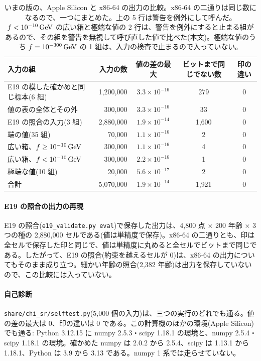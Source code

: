 \begin{table}[H]
\centering\small
\begin{tabular}{lrccc}
\toprule
入力の組 & 入力の数 & 値の差の最大 & ビットまで同じでない数 & 印の違い\\
\midrule
E19 の模した確かめと同じ標本(6 組) & 1{,}200{,}000 & $3.3\times10^{-16}$ & 279 & 0\\
値の表の全体とその外 & 300{,}000 & $3.3\times10^{-16}$ & 33 & 0\\
E19 の照合の入力(3 組) & 2{,}880{,}000 & $1.9\times10^{-14}$ & 1{,}600 & 0\\
端の値(35 組) & 70{,}000 & $1.1\times10^{-16}$ & 2 & 0\\
広い箱、$f\ge10^{-10}\,\mathrm{GeV}$ & 300{,}000 & $1.1\times10^{-16}$ & 4 & 0\\
\midrule
広い箱、$f<10^{-10}\,\mathrm{GeV}$ & 300{,}000 & $2.2\times10^{-16}$ & 1 & 0\\
極端な値(10 組) & 20{,}000 & $5.6\times10^{-17}$ & 2 & 0\\
\midrule
合計 & 5{,}070{,}000 & $1.9\times10^{-14}$ & 1{,}921 & 0\\
\bottomrule
\end{tabular}
\caption{いまの版の、Apple Silicon と x86-64 の出力の比較。x86-64 の二通りは同じ数になるので、一つにまとめた。上の 5 行は警告を例外にして呼んだ。$f<10^{-10}\,\mathrm{GeV}$ の広い箱と極端な値の 2 行は、警告を例外にすると止まる組があるので、その組を警告を無視して呼び直した値で比べた(本文)。極端な値のうち $f=10^{-300}\,\mathrm{GeV}$ の 1 組は、入力の検査で止まるので入っていない。}
\label{tab:e20new}
\end{table}

\paragraph{E19 の照合の出力の再現}
E19 の照合(\texttt{e19\_validate.py eval})で保存した出力は、4{,}800 点 × 200 年齢 × 3 つの種の 2{,}880{,}000 セルである(値は単精度で保存)。x86-64 の二通りとも、印は全セルで保存した印と同じで、値は単精度に丸めると全セルでビットまで同じである。したがって、E19 の照合(約束を越えるセルが 0)は、x86-64 の出力についてもそのまま成り立つ。細かい年齢の照合(2{,}382 年齢)は出力を保存していないので、この比較には入っていない。

\paragraph{自己診断}
\texttt{share/chi\_sr/selftest.py}(5{,}000 個の入力)は、三つの実行のどれでも通る。値の差の最大は 0、印の違いは 0 である。この計算機のほかの環境(Apple Silicon)でも通る: Python 3.12.15 に numpy 2.5.3・scipy 1.18.1 の環境と、numpy 2.5.4・scipy 1.18.1 の環境。確かめた numpy は 2.0.2 から 2.5.4、scipy は 1.13.1 から 1.18.1、Python は 3.9 から 3.13 である。numpy 1 系では走らせていない。

